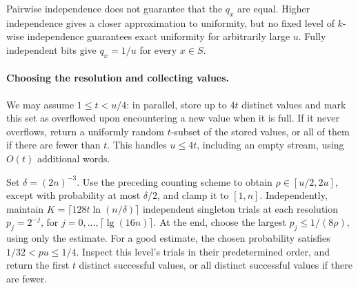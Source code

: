 \begin{remark}
    Pairwise independence does not guarantee that the $q_x$ are equal.
    Higher independence gives a closer approximation to uniformity, but
    no fixed level of $k$-wise independence guarantees exact uniformity
    for arbitrarily large $u$. Fully independent bits give $q_x=1/u$
    for every $x\in S$.
\end{remark}

\paragraph*{Choosing the resolution and collecting values.}
We may assume $1\leq t<u/4$: in parallel, store up to $4t$ distinct values
and mark this set as overflowed upon encountering a new value when it is
full. If it never overflows, return a uniformly random $t$-subset of the
stored values, or all of them if there are fewer than $t$. This handles
$u\leq4t$, including an empty stream, using $O(t)$ additional words.

Set $\delta=(2n)^{-3}$. Use the preceding counting scheme to obtain
$\rho\in[u/2,2u]$, except with probability at most $\delta/2$, and clamp
it to $[1,n]$. Independently, maintain
$K=\lceil128t\ln(n/\delta)\rceil$ independent singleton trials at each
resolution $p_j=2^{-j}$, for $j=0,\ldots,\lceil\lg(16n)\rceil$.
At the end, choose the largest $p_j\leq1/(8\rho)$, using only the estimate.
For a good estimate, the chosen probability satisfies $1/32<pu\leq1/4$.
Inspect this level's trials in their predetermined order, and return the
first $t$ distinct successful values, or all distinct successful values
if there are fewer.

